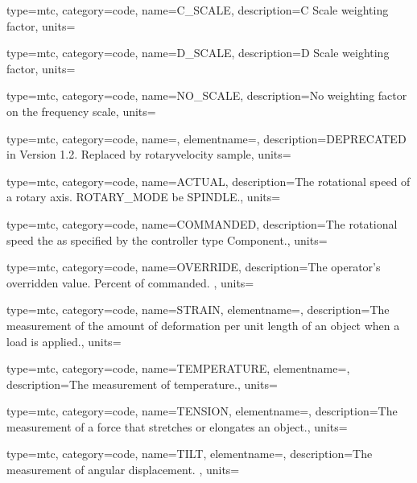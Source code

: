{
  type=mtc,
  category=code,
  name={C\_SCALE},
  description={C Scale weighting factor},
  units=
}

{
  type=mtc,
  category=code,
  name={D\_SCALE},
  description={D Scale weighting factor},
  units=
}

{
  type=mtc,
  category=code,
  name={NO\_SCALE},
  description={No weighting factor on the frequency scale},
  units=
}

{
  type=mtc,
  category=code,
  name={},
  elementname=,
  description={DEPRECATED in Version 1.2.  Replaced by \gls{rotaryvelocity sample}},
  units={}
}

{
  type=mtc,
  category=code,
  name={ACTUAL},
  description={The rotational speed of a rotary axis.  ROTARY\_MODE \must be SPINDLE.},
  units=
}

{
  type=mtc,
  category=code,
  name={COMMANDED},
  description={The rotational speed the as specified by the \gls{controller} type Component.},
  units=
}

{
  type=mtc,
  category=code,
  name={OVERRIDE},
  description={The operator’s overridden value.  Percent of commanded. },
  units=
}

{
  type=mtc,
  category=code,
  name={STRAIN},
  elementname=,
  description={The measurement of the amount of deformation per unit length of an object when a load is applied.},
  units=
}

{
  type=mtc,
  category=code,
  name={TEMPERATURE},
  elementname=,
  description={The measurement of temperature.},
  units=
}

{
  type=mtc,
  category=code,
  name={TENSION},
  elementname=,
  description={The measurement of a force that stretches or elongates an object.},
  units=
}

{
  type=mtc,
  category=code,
  name={TILT},
  elementname=,
  description={The measurement of angular displacement. },
  units=
}

